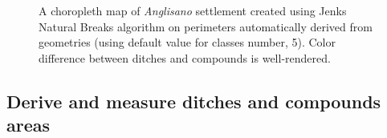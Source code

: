             \begin{figure}
                \centering
                \caption[A choropleth map of \emph{Anglisano} settlement using Jenks Natural Breaks]{A choropleth map of \emph{Anglisano} settlement created using Jenks Natural Breaks algorithm on perimeters automatically derived from geometries (using default value for classes number, 5). Color difference between ditches and compounds is well-rendered.}
                \label{fig:jenks-color}
            \end{figure}

        \subsection{Derive and measure ditches and compounds areas\label{sec:comp-area}}

